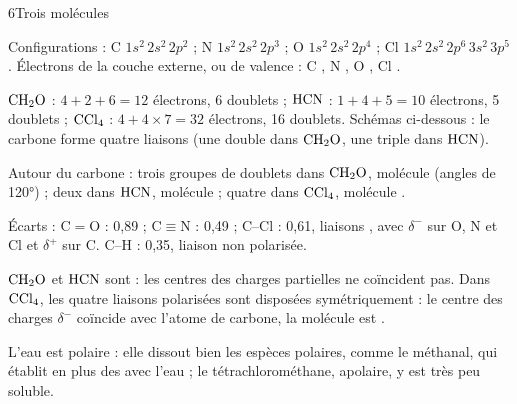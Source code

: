 \begin{corrigeBac}{6}{Trois molécules}
\begin{questions}
\item Configurations : C $1s^2\,2s^2\,2p^2$ ; N $1s^2\,2s^2\,2p^3$ ; O $1s^2\,2s^2\,2p^4$ ; Cl $1s^2\,2s^2\,2p^6\,3s^2\,3p^5$. Électrons de la
couche externe, ou de valence : C , N , O , Cl . \pts{1 pt}
\item $\ce{CH2O}$ : $4+2+6=12$ électrons, 6 doublets ; $\ce{HCN}$ : $1+4+5=10$ électrons, 5 doublets ; $\ce{CCl4}$ : $4+4\times7=32$ électrons,
16 doublets. Schémas ci-dessous : le carbone forme quatre liaisons (une double dans $\ce{CH2O}$, une triple dans $\ce{HCN}$). 
\item Autour du carbone : trois groupes de doublets dans $\ce{CH2O}$, molécule  (angles de \ang{120}) ; deux dans $\ce{HCN}$,
molécule  ; quatre dans $\ce{CCl4}$, molécule . \pts{1 pt}
\item Écarts : C$=$O : 0,89 ; C$\equiv$N : 0,49 ; C--Cl : 0,61, liaisons , avec $\delta^-$ sur O, N et Cl et $\delta^+$ sur C.
C--H : 0,35, liaison non polarisée. \pts{1 pt}
\item $\ce{CH2O}$ et $\ce{HCN}$ sont  : les centres des charges partielles ne coïncident pas. Dans $\ce{CCl4}$, les quatre liaisons
polarisées sont disposées symétriquement : le centre des charges $\delta^-$ coïncide avec l'atome de carbone, la molécule est
. \pts{1 pt}
\item L'eau est polaire : elle dissout bien les espèces polaires, comme le méthanal, qui établit en plus des  avec l'eau ; le tétrachlorométhane, apolaire, y est très peu soluble. 
\end{questions}
\end{corrigeBac}


